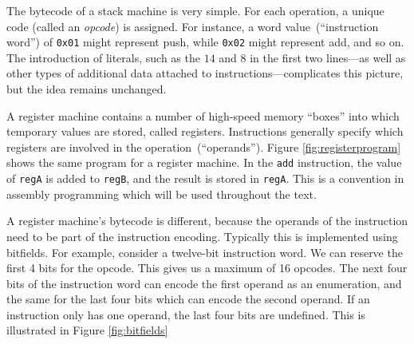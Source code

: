 			The bytecode of a stack machine is very simple. For each operation, a unique code (called an \emph{opcode}) is assigned. For instance, a word value~(``instruction word'') of \texttt{0x01} might represent push, while \texttt{0x02} might represent add, and so on. The introduction of literals, such as the $14$ and $8$ in the first two lines---as well as other types of additional data attached to instructions---complicates this picture, but the idea remains unchanged.
		
			A register machine contains a number of high-speed memory ``boxes'' into which temporary values are stored, called registers. Instructions generally specify which registers are involved in the operation~(``operands''). Figure \ref{fig:registerprogram} shows the same program for a register machine. In the \texttt{add} instruction, the value of \texttt{regA} is added to \texttt{regB}, and the result is stored in \texttt{regA}. This is a convention in assembly programming which will be used throughout the text.
		
			A register machine's bytecode is different, because the operands of the instruction need to be part of the instruction encoding. Typically this is implemented using bitfields. For example, consider a twelve-bit instruction word. We can reserve the first 4 bits for the opcode. This gives us a maximum of 16 opcodes. The next four bits of the instruction word can encode the first operand as an enumeration, and the same for the last four bits which can encode the second operand. If an instruction only has one operand, the last four bits are undefined. This is illustrated in Figure \ref{fig:bitfields}
			
			
